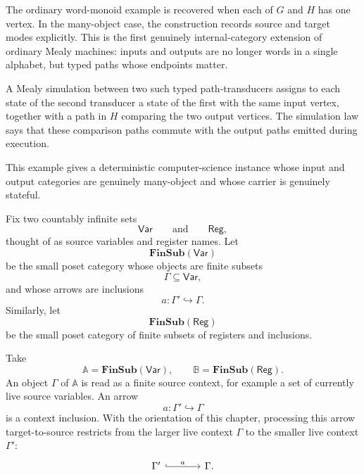 \begin{example}
    The ordinary word-monoid example is recovered when each of \(G\) and \(H\) has one vertex. In the many-object case, the construction records source and target modes explicitly. This is the first genuinely internal-category extension of ordinary Mealy machines: inputs and outputs are no longer words in a single alphabet, but typed paths whose endpoints matter.
    
    A Mealy simulation between two such typed path-transducers assigns to each state of the second transducer a state of the first with the same input vertex, together with a path in \(H\) comparing the two output vertices. The simulation law says that these comparison paths commute with the output paths emitted during execution.
\end{example}

\begin{example}
\label{example:context-restriction-register-allocation-machines}
    This example gives a deterministic computer-science instance whose input and output categories are genuinely many-object and whose carrier is genuinely stateful.
    
    Fix two countably infinite sets
    \[
        \mathsf{Var}
        \qquad\text{and}\qquad
        \mathsf{Reg},
    \]
    thought of as source variables and register names. Let
    \[
        \mathbf{FinSub}(\mathsf{Var})
    \]
    be the small poset category whose objects are finite subsets
    \[
        \Gamma\subseteq \mathsf{Var},
    \]
    and whose arrows are inclusions
    \[
        a:\Gamma'\hookrightarrow \Gamma.
    \]
    Similarly, let
    \[
        \mathbf{FinSub}(\mathsf{Reg})
    \]
    be the small poset category of finite subsets of registers and inclusions.
    
    Take
    \[
        \mathbb A=\mathbf{FinSub}(\mathsf{Var}),
        \qquad
        \mathbb B=\mathbf{FinSub}(\mathsf{Reg}).
    \]
    An object \(\Gamma\) of \(\mathbb A\) is read as a finite source context, for example a set of currently live source variables. An arrow
    \[
        a:\Gamma'\hookrightarrow \Gamma
    \]
    is a context inclusion. With the orientation of this chapter, processing this arrow target-to-source restricts from the larger live context \(\Gamma\) to the smaller live context \(\Gamma'\):
    \[
        \begin{tikzcd}[column sep=large]
                \Gamma'
                    \arrow[r, hook, "a"]
            &
                \Gamma.
        \end{tikzcd}
    \]
    

\end{example}
